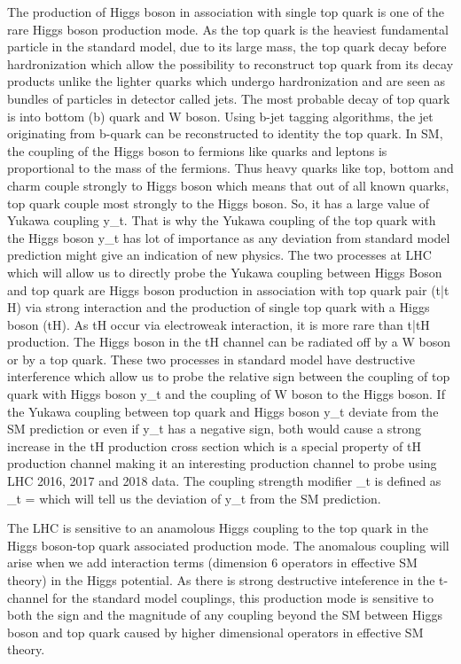 \documentclass[final,3p]{CSP}
\begin{document}
The production of Higgs boson in association with single top quark is one of the rare Higgs boson production mode. As the top 
quark is the heaviest fundamental particle in the standard model, due to its large mass, the top quark decay before 
hardronization which allow the possibility to reconstruct top quark from its decay products unlike the lighter quarks which 
undergo hardronization and are seen as bundles of particles in detector called jets. The most probable decay of top quark is into 
bottom (b) quark and W boson. Using b-jet tagging algorithms, the jet originating from b-quark can be reconstructed to identity 
the top quark. In SM, the coupling of the Higgs boson to fermions like quarks and leptons is proportional to the mass of the 
fermions. Thus heavy quarks like top, bottom and charm couple strongly to Higgs boson which means that out of all known quarks, 
top quark couple most strongly to the Higgs boson. So, it has a large value of Yukawa coupling y_t. That is why the Yukawa 
coupling of the top quark with the Higgs boson y_t has lot of importance as any deviation from standard model prediction might 
give an indication of new physics. The two processes at LHC which will allow us to directly probe the Yukawa coupling between 
Higgs Boson and top quark are Higgs boson production in association with top quark pair (t\bar{t} H) via strong interaction and 
the production of single top quark with a Higgs boson (tH). As tH occur via electroweak interaction, it is more rare than 
t\bar{t}H production. The Higgs boson in the tH channel can be radiated off by a W boson or by a top quark. These two processes 
in standard model have destructive interference which allow us to probe the relative sign between the coupling of top quark with 
Higgs boson y_t and the coupling of W boson to the Higgs boson. If the Yukawa coupling between top quark and Higgs boson y_t 
deviate from the SM prediction or even if y_t has a negative sign, both would cause a strong increase in the tH production cross 
section which is a special property of tH production channel making it an interesting production channel to probe using LHC 
2016, 2017 and 2018 data. The coupling strength modifier \kappa_t is defined as \kappa_t =  which will tell us the 
deviation of y_t from the SM prediction. 

The LHC is sensitive to an anamolous Higgs coupling to the top quark in the Higgs boson-top quark associated production mode. The 
anomalous coupling will arise when we add interaction terms (dimension 6 operators in effective SM theory) in the Higgs potential. As 
there is strong destructive inteference in the t-channel for the standard model couplings, this production mode is sensitive to both the 
sign and the magnitude of any coupling beyond the SM between Higgs boson and top quark caused by higher dimensional operators in 
effective SM theory.
\end{document}
